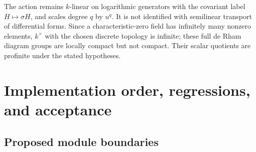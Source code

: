 \documentclass[11pt]{article}
\theoremstyle{remark}\newtheorem{remark}[theorem]{Remark}
\begin{document}
The action remains $k$-linear on logarithmic generators with the
covariant label $H\mapsto\sigma H$, and scales degree $q$ by $u^q$.
It is not identified with semilinear transport of differential forms.
Since a characteristic-zero field has infinitely many nonzero elements,
$k^\times$ with the chosen discrete topology is infinite; these full
de Rham diagram groups are locally compact but not compact. Their
scalar quotients are profinite under the stated hypotheses.

\section{Implementation order, regressions, and acceptance}
\label{sec:implementation}

\subsection{Proposed module boundaries}
\end{document}
